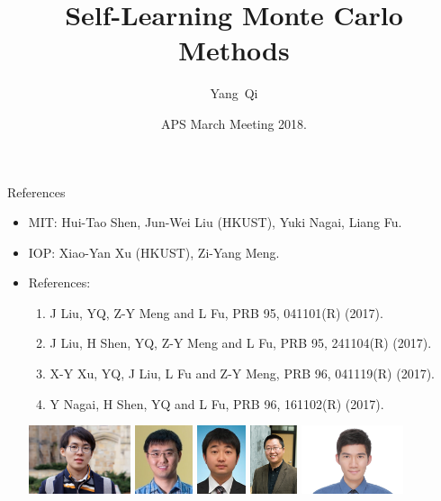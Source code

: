 \documentclass[xcolor=table, 10pt, aspectratio=169]{beamer}
\title[SMLC] %
{Self-Learning Monte Carlo Methods}
\author[Y Qi] %
{Yang~Qi}
\institute[Fudan] %
{Department of Physics, Fudan University}
\date{APS March Meeting 2018.}
\begin{document}
\begin{frame}
  \titlepage
\end{frame}

\begin{frame}{References}
\begin{itemize}
\item MIT: Hui-Tao Shen, Jun-Wei Liu (HKUST), Yuki Nagai, Liang Fu.
\item IOP: Xiao-Yan Xu (HKUST), Zi-Yang Meng.
\item References:
\begin{enumerate}
  \item J Liu, YQ, Z-Y Meng and L Fu, PRB 95, 041101(R) (2017).
  \item J Liu, H Shen, YQ, Z-Y Meng and L Fu, PRB 95, 241104(R) (2017).
  \item X-Y Xu, YQ, J Liu, L Fu and Z-Y Meng, PRB 96, 041119(R) (2017).
  \item Y Nagai, H Shen, YQ and L Fu, PRB 96, 161102(R) (2017).
\end{enumerate}
\begin{center}
	\includegraphics[height=2cm]{../people/huitaoshen}
	\includegraphics[height=2cm]{../people/junweiliu}
	\includegraphics[height=2cm]{../people/yuki}
	\includegraphics[height=2cm]{../people/liangfu}
	\includegraphics[height=2cm]{../people/xiaoyanxu}

\end{center}
\end{itemize}
\end{frame}
\end{document}
